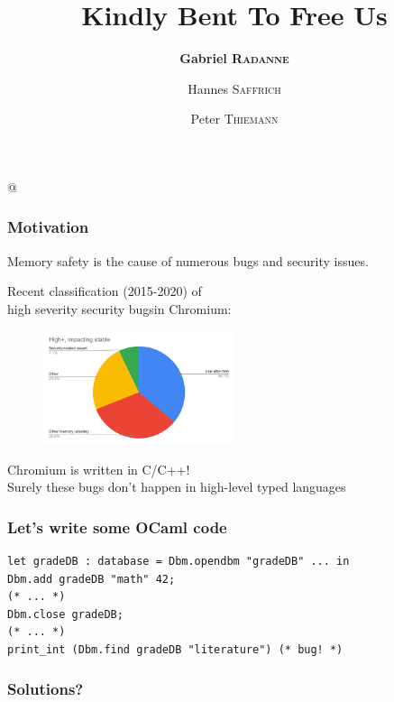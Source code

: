 \documentclass[aspectratio=169,dvipsnames,svgnames,10pt]{beamer}
\title{Kindly Bent To Free Us}
\author{\textbf{Gabriel \textsc{Radanne}}
  \and Hannes \textsc{Saffrich}
  \and Peter \textsc{Thiemann}}
\begin{document}
\lstMakeShortInline[keepspaces,basicstyle=\small\ttfamily]@

\frame[plain]{\titlepage}


\begin{frame}
  \frametitle{Motivation}

  Memory safety is the cause of numerous bugs and security issues.
  
  Recent classification (2015-2020) of\\ \og high severity security bugs\fg in Chromium:

  \begin{figure}[h]
    \centering
    \includegraphics[width=0.5\textwidth]
    {chromium-use-after-free}
  \end{figure}

  \pause
  Chromium is written in C/C++!\\
  Surely these bugs don't happen in high-level typed languages
  
\end{frame}

\begin{frame}[fragile]
  \frametitle{Let's write some OCaml code}

\begin{verbatim}
let gradeDB : database = Dbm.opendbm "gradeDB" ... in
Dbm.add gradeDB "math" 42;
(* ... *)
Dbm.close gradeDB;
(* ... *)
print_int (Dbm.find gradeDB "literature") (* bug! *)
\end{verbatim}
  
\end{frame}

\begin{frame}
  \frametitle{Solutions?}

  
\end{frame}
\end{document}
